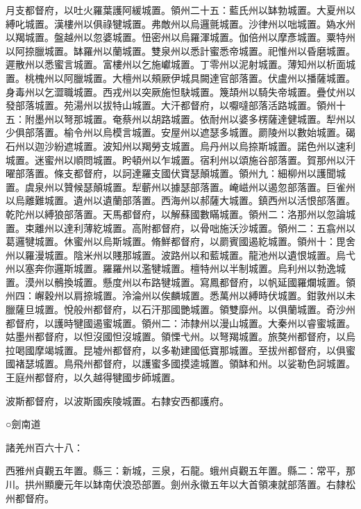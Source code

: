 \begin{pinyinscope}
 月支都督府，以吐火羅葉護阿緩城置。領州二十五：藍氏州以缽勃城置。大夏州以縛叱城置。漢樓州以俱祿犍城置。弗敵州以烏邏氈城置。沙律州以咄城置。媯水州以羯城置。盤越州以忽婆城置。忸密州以烏羅渾城置。伽倍州以摩彥城置。粟特州以阿捺臘城置。缽羅州以蘭城置。雙泉州以悉計蜜悉帝城置。祀惟州以昏磨城置。遲散州以悉蜜言城置。富樓州以乞施巘城置。丁零州以泥射城置。薄知州以析面城置。桃槐州以阿臘城置。大檀州以頰厥伊城具闕達官部落置。伏盧州以播薩城置。身毒州以乞澀職城置。西戎州以突厥施怛駃城置。篾頡州以騎失帝城置。疊仗州以發部落城置。苑湯州以拔特山城置。大汗都督府，以嚈噠部落活路城置。領州十五：附墨州以弩那城置。奄蔡州以胡路城置。依耐州以婆多楞薩達健城置。犁州以少俱部落置。榆令州以烏模言城置。安屋州以遮瑟多城置。罽陵州以數始城置。碣石州以迦沙紛遮城置。波知州以羯勞支城置。烏丹州以烏捺斯城置。諾色州以速利城置。迷蜜州以順問城置。盻頓州以乍城置。宿利州以頌施谷部落置。賀那州以汗曜部落置。條支都督府，以訶達羅支國伏寶瑟顛城置。領州九：細柳州以護聞城置。虞泉州以贊候瑟顛城置。犁蘄州以據瑟部落置。崦嵫州以遏忽部落置。巨雀州以烏離難城置。遺州以遺蘭部落置。西海州以郝薩大城置。鎮西州以活恨部落置。乾陀州以縛狼部落置。天馬都督府，以解蘇國數瞞城置。領州二：洛那州以忽論城置。束離州以達利薄紇城置。高附都督府，以骨咄施沃沙城置。領州二：五翕州以葛邏犍城置。休蜜州以烏斯城置。脩鮮都督府，以罽賓國遏紇城置。領州十：毘舍州以羅漫城置。陰米州以賤那城置。波路州以和藍城置。龍池州以遺恨城置。烏弋州以塞奔你邏斯城置。羅羅州以濫犍城置。檀特州以半制城置。烏利州以勃逸城置。漠州以鶻換城置。懸度州以布路犍城置。寫鳳都督府，以帆延國羅爛城置。領州四：嶰穀州以肩捺城置。泠淪州以俟麟城置。悉萬州以縛時伏城置。鉗敦州以未臘薩旦城置。悅般州都督府，以石汗那國艷城置。領雙靡州。以俱蘭城置。奇沙州都督府，以護時犍國遏蜜城置。領州二：沛隸州以漫山城置。大秦州以睿蜜城置。姑墨州都督府，以怛沒國怛沒城置。領慄弋州。以弩羯城置。旅獒州都督府，以烏拉喝國摩竭城置。昆墟州都督府，以多勒建國低寶那城置。至拔州都督府，以俱蜜國褚瑟城置。鳥飛州都督府，以護蜜多國摸逵城置。領缽和州。以娑勒色訶城置。王庭州都督府，以久越得犍國步師城置。



 波斯都督府，以波斯國疾陵城置。右隸安西都護府。



 ○劍南道



 諸羌州百六十八：



 西雅州貞觀五年置。縣三：新城，三泉，石龍。蛾州貞觀五年置。縣二：常平，那川。拱州顯慶元年以缽南伏浪恐部置。劍州永徽五年以大首領凍就部落置。右隸松州都督府。




\end{pinyinscope}

